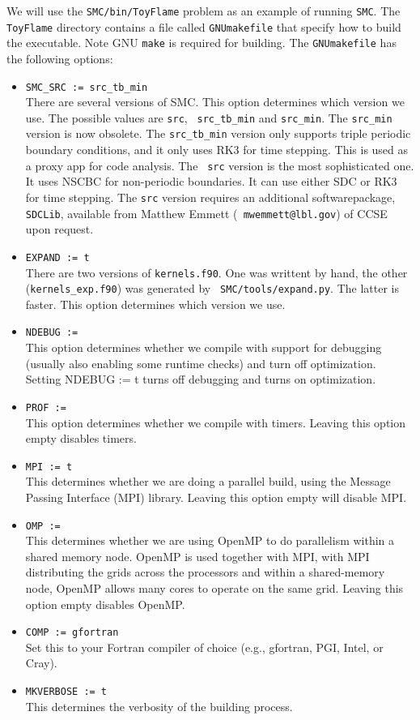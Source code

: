 \documentclass[11pt,letterpaper]{article}
\begin{document}
We will use the {\tt SMC/bin/ToyFlame} problem as an example of
running {\tt SMC}.  The {\tt ToyFlame} directory contains a file
called {\tt GNUmakefile} that specify how to build the executable.
Note GNU {\tt make} is required for building.  The {\tt GNUmakefile}
has the following options:
\begin{itemize}
\item {\tt SMC\_SRC := src\_tb\_min}\\
  There are several versions of SMC.  This option determines which
  version we use.  The possible values are {\tt src}, {\tt
    src\_tb\_min} and {\tt src\_min}.  The {\tt src\_min} version is
  now obsolete.  The {\tt src\_tb\_min} version only supports triple
  periodic boundary conditions, and it only uses RK3 for time
  stepping.  This is used as a proxy app for code analysis. The {\tt
    src} version is the most sophisticated one.  It uses NSCBC for
  non-periodic boundaries.  It can use either SDC or RK3 for time
  stepping.  The {\tt src} version requires an additional
  softwarepackage, {\tt SDCLib}, available from Matthew Emmett ({\tt
    mwemmett@lbl.gov}) of CCSE upon request.
\item {\tt EXPAND := t}\\
  There are two versions of {\tt kernels.f90}.  One was writtent by
  hand, the other ({\tt kernels\_exp.f90}) was generated by {\tt
    SMC/tools/expand.py}.  The latter is faster.  This option
  determines which version we use.
\item {\tt NDEBUG :=}\\
  This option determines whether we compile with support for debugging
  (usually also enabling some runtime checks) and turn off
  optimization. Setting NDEBUG := t turns off debugging and turns on
  optimization. 
\item {\tt PROF :=}\\
  This option determines whether we compile with timers. Leaving this
  option empty disables timers.
\item {\tt MPI := t}\\
  This determines whether we are doing a parallel build, using the
  Message Passing Interface (MPI) library. Leaving this
  option empty will disable MPI.
\item {\tt OMP :=}\\
  This determines whether we are using OpenMP to do parallelism within
  a shared memory node. OpenMP is used together with MPI, with MPI
  distributing the grids across the processors and within a
  shared-memory node, OpenMP allows many cores to operate on the same
  grid.  Leaving this option empty disables OpenMP.
\item {\tt COMP := gfortran}\\
  Set this to your Fortran compiler of choice (e.g., gfortran, PGI,
  Intel, or Cray).
\item {\tt MKVERBOSE := t}\\
  This determines the verbosity of the building process.
\end{itemize}
\end{document}
